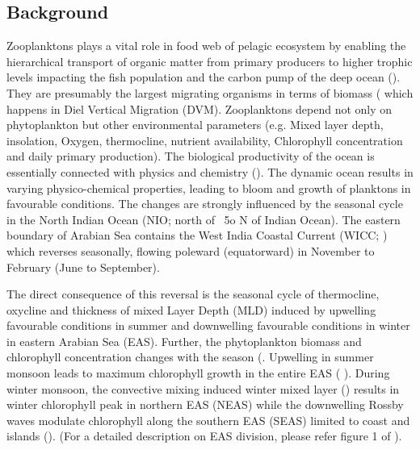\documentclass{article}
\begin{document}
	\subsection{Background}
	Zooplanktons plays a vital role in food web of pelagic ecosystem by enabling the hierarchical transport of organic matter from primary producers to higher trophic levels impacting the fish population and the carbon pump of the deep ocean (\citep{ohman2001density,le2016global}). They are presumably the largest migrating organisms in terms of biomass (\citep{hays2003review} which happens in Diel Vertical Migration (DVM). Zooplanktons depend not only on phytoplankton but other environmental parameters (e.g. Mixed layer depth, insolation, Oxygen, thermocline, nutrient availability, Chlorophyll concentration and daily primary production). The biological productivity of the ocean is essentially connected with physics and chemistry (\citep{subrahmanyan1959studiespart2, ryther1966primary, qasim1977biological, nair1970primary,mccreary2009biophysical, vijith2016consequences}). The dynamic ocean results in varying physico-chemical properties, leading to bloom and growth of planktons in favourable conditions. The changes are strongly influenced by the seasonal cycle in the North Indian Ocean (NIO; north of ~5o N of Indian Ocean). The eastern boundary of Arabian Sea contains the West India Coastal Current (WICC; \citep{banse1968hydrography,shetye1991coastal,mccreary1993numerical, shankar1997dynamics, shetye1998coastal,amol2014observed, chaudhuri2020observed,chaudhuri2021observed}) which reverses seasonally, flowing poleward (equatorward) in November to February (June to September). 
	
	The direct consequence of this reversal is the seasonal cycle of thermocline, oxycline and thickness of mixed Layer Depth (MLD) induced by upwelling favourable conditions in summer and downwelling favourable conditions in winter in eastern Arabian Sea (EAS). Further, the phytoplankton biomass and chlorophyll concentration changes with the season (\citep{subrahmanyan1960studies, banse1968hydrography, levy2007basin, vijith2016consequences}. Upwelling in  summer monsoon leads to maximum chlorophyll growth in the entire EAS ( \citep{ banse1968hydrography, banse2000geographical, mccreary2009biophysical, hood2017biogeochemical}). During winter monsoon, the convective mixing induced winter mixed layer (\citep{shetye1992does, madhupratap1996mechanism, levy2007basin, vijith2016consequences, shankar2016inhibition, keerthi2017physical}) results in winter chlorophyll peak in northern EAS (NEAS) while the downwelling Rossby waves modulate chlorophyll along the southern EAS (SEAS) limited to coast and islands (\citep{amol2020modulation}). (For a detailed description on EAS division, please refer figure 1 of \citep{shankar2019role}).
	
\end{document}
